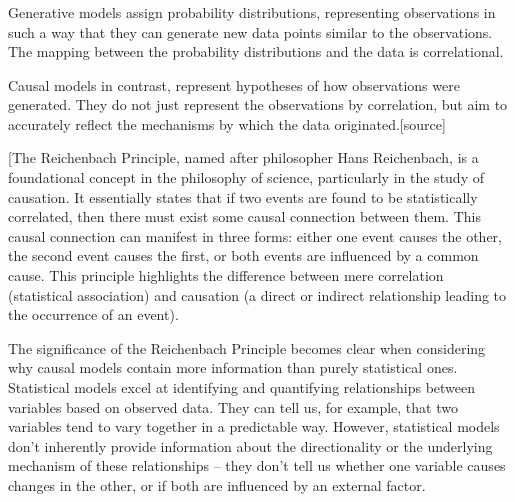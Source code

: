 \subsubsection{}
\subsubsection{}
\subsubsection{}
\subsubsection{}
\subsubsection{}

Generative models assign probability distributions, representing observations in such a way that they can generate new data points similar to the observations. The mapping between the probability distributions and the data is correlational. 

Causal models in contrast, represent hypotheses of how observations were generated. They do not just represent the observations by correlation, but aim to accurately reflect the mechanisms by which the data originated.[source]



[The Reichenbach Principle, named after philosopher Hans Reichenbach, is a foundational concept in the philosophy of science, particularly in the study of causation. It essentially states that if two events are found to be statistically correlated, then there must exist some causal connection between them. This causal connection can manifest in three forms: either one event causes the other, the second event causes the first, or both events are influenced by a common cause. This principle highlights the difference between mere correlation (statistical association) and causation (a direct or indirect relationship leading to the occurrence of an event).

The significance of the Reichenbach Principle becomes clear when considering why causal models contain more information than purely statistical ones. Statistical models excel at identifying and quantifying relationships between variables based on observed data. They can tell us, for example, that two variables tend to vary together in a predictable way. However, statistical models don't inherently provide information about the directionality or the underlying mechanism of these relationships – they don't tell us whether one variable causes changes in the other, or if both are influenced by an external factor.

